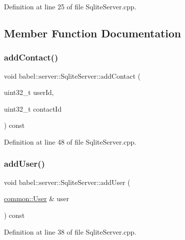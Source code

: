 Definition at line 25 of file Sqlite\+Server.\+cpp.



\subsection{Member Function Documentation}
\mbox{\label{classbabel_1_1server_1_1_sqlite_server_a8d9428a329928080f449eaca7c7d8f80}} 
\subsubsection{\texorpdfstring{add\+Contact()}{addContact()}}
{\footnotesize\ttfamily void babel\+::server\+::\+Sqlite\+Server\+::add\+Contact (\begin{DoxyParamCaption}\item[{uint32\+\_\+t}]{user\+Id,  }\item[{uint32\+\_\+t}]{contact\+Id }\end{DoxyParamCaption}) const}



Definition at line 48 of file Sqlite\+Server.\+cpp.

\mbox{\label{classbabel_1_1server_1_1_sqlite_server_a699fb4106518510a5105616704eca892}} 
\subsubsection{\texorpdfstring{add\+User()}{addUser()}}
{\footnotesize\ttfamily void babel\+::server\+::\+Sqlite\+Server\+::add\+User (\begin{DoxyParamCaption}\item[{\mbox{\hyperlink{classbabel_1_1common_1_1_user}{common\+::\+User}} \&}]{user }\end{DoxyParamCaption}) const}



Definition at line 38 of file Sqlite\+Server.\+cpp.

